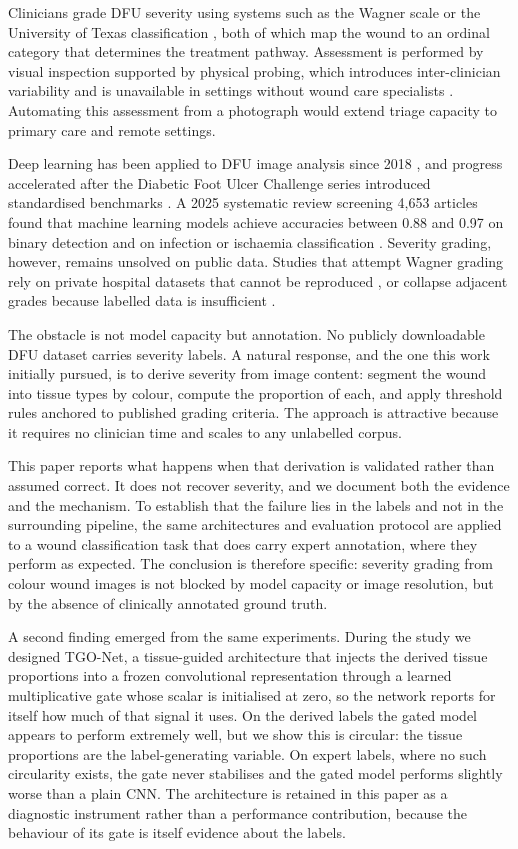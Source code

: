 Clinicians grade DFU severity using systems such as the Wagner scale
\cite{wagner1981} or the University of Texas classification
\cite{armstrong1998}, both of which map the wound to an ordinal category
that determines the treatment pathway. Assessment is performed by visual
inspection supported by physical probing, which introduces inter-clinician
variability and is unavailable in settings without wound care specialists
\cite{vannetten2020}. Automating this assessment from a photograph would
extend triage capacity to primary care and remote settings.

Deep learning has been applied to DFU image analysis since 2018
\cite{goyal2018}, and progress accelerated after the Diabetic Foot Ulcer
Challenge series introduced standardised benchmarks \cite{cassidy2021}. A
2025 systematic review screening 4{,}653 articles found that machine
learning models achieve accuracies between 0.88 and 0.97 on binary
detection and on infection or ischaemia classification \cite{gomes2025}.
Severity grading, however, remains unsolved on public data. Studies that
attempt Wagner grading rely on private hospital datasets that cannot be
reproduced \cite{zhou2025,abebe2025}, or collapse adjacent grades because
labelled data is insufficient \cite{zhou2025}.

The obstacle is not model capacity but annotation. No publicly downloadable
DFU dataset carries severity labels. A natural response, and the one this
work initially pursued, is to derive severity from image content: segment
the wound into tissue types by colour, compute the proportion of each, and
apply threshold rules anchored to published grading criteria. The approach
is attractive because it requires no clinician time and scales to any
unlabelled corpus.

This paper reports what happens when that derivation is validated rather
than assumed correct. It does not recover severity, and we document both
the evidence and the mechanism. To establish that the failure lies in the
labels and not in the surrounding pipeline, the same architectures and
evaluation protocol are applied to a wound classification task that does
carry expert annotation, where they perform as expected. The conclusion is
therefore specific: severity grading from colour wound images is not
blocked by model capacity or image resolution, but by the absence of
clinically annotated ground truth.

A second finding emerged from the same experiments. During the study we
designed TGO-Net, a tissue-guided architecture that injects the derived
tissue proportions into a frozen convolutional representation through a
learned multiplicative gate whose scalar is initialised at zero, so the
network reports for itself how much of that signal it uses. On the derived
labels the gated model appears to perform extremely well, but we show this
is circular: the tissue proportions are the label-generating variable. On
expert labels, where no such circularity exists, the gate never stabilises
and the gated model performs slightly worse than a plain CNN. The
architecture is retained in this paper as a diagnostic instrument rather
than a performance contribution, because the behaviour of its gate is
itself evidence about the labels.

